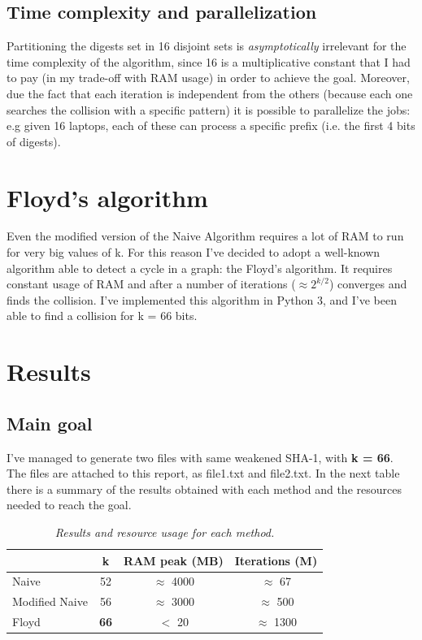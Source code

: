 \documentclass[11 pt]{article}
\begin{document}
\subsection{Time complexity and parallelization}
Partitioning the digests set in 16 disjoint sets  is \textit{asymptotically} irrelevant for the time complexity of the algorithm, since 16 is a multiplicative constant that I had to pay (in my trade-off with RAM usage) in order to achieve the goal. Moreover, due the fact that each iteration is independent from the others (because each one searches the collision with a specific pattern) it is possible to parallelize the jobs: e.g given 16 laptops, each of these can process a specific prefix (i.e. the first 4 bits of digests).

\section{Floyd's algorithm}
Even the modified version of the Naive Algorithm requires a lot of RAM to run for very big values of k. For this reason I've decided to adopt a well-known algorithm able to detect a cycle in a graph: the Floyd's algorithm. It requires constant usage of RAM and after a number of iterations ($\approx 2^{k/2}$) converges and finds the collision. I've implemented this algorithm in Python 3, and I've been able to find a collision for k = 66 bits.

\section{Results}
\subsection{Main goal}
I've managed to generate two files with same weakened SHA-1, with \textbf{k = 66}. The files are attached to this report, as file1.txt and file2.txt. In the next table there is a summary of the results obtained  with each method and the resources needed to reach the goal.

\begin{table}[!h]
	\begin{center}
		\begin{tabular}{| l | c | c | c |}
			\hline
			& k & RAM peak (MB) & Iterations (M) \\
			\hline
			Naive & 52 & $\approx$ 4000 & $\approx$ 67 \\
			\hline	
			Modified Naive & 56 & $\approx$ 3000 & $\approx$ 500 \\
			\hline	
			Floyd & \textbf{66} & $<$ 20 & $\approx$ 1300 \\
			\hline	
		\end{tabular}
		\caption{\textit{Results and resource usage for each method.}}
		\label{table:1}
	\end{center}
\end{table}
\end{document}
